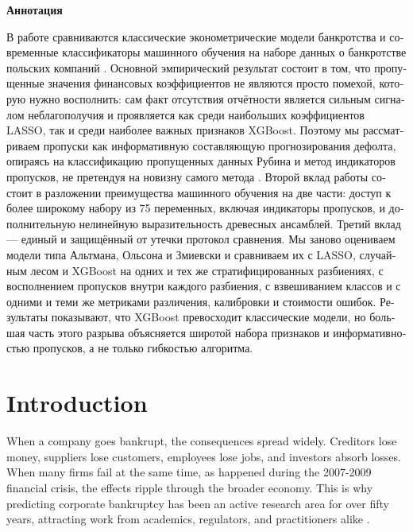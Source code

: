 \documentclass[12pt,a4paper]{article}
\begin{document}
\begin{otherlanguage}{russian}
\begin{center}
\textbf{Аннотация}
\end{center}
\noindent
В работе сравниваются классические эконометрические модели банкротства и
современные классификаторы машинного обучения на наборе данных о банкротстве
польских компаний \cite{zieba2016}. Основной эмпирический результат состоит в
том, что пропущенные значения финансовых коэффициентов не являются просто
помехой, которую нужно восполнить: сам факт отсутствия отчётности является
сильным сигналом неблагополучия и проявляется как среди наибольших
коэффициентов LASSO, так и среди наиболее важных признаков XGBoost. Поэтому мы
рассматриваем пропуски как информативную составляющую прогнозирования дефолта,
опираясь на классификацию пропущенных данных Рубина и метод индикаторов
пропусков, не претендуя на новизну самого метода \citep{rubin1976,jones1996}.
Второй вклад работы состоит в разложении преимущества машинного обучения на две
части: доступ к более широкому набору из 75 переменных, включая индикаторы
пропусков, и дополнительную нелинейную выразительность древесных ансамблей.
Третий вклад — единый и защищённый от утечки протокол сравнения. Мы заново
оцениваем модели типа Альтмана, Ольсона и Змиевски и сравниваем их с LASSO,
случайным лесом и XGBoost на одних и тех же стратифицированных разбиениях, с
восполнением пропусков внутри каждого разбиения, с взвешиванием классов и с
одними и теми же метриками различения, калибровки и стоимости ошибок.
Результаты показывают, что XGBoost превосходит классические модели, но большая
часть этого разрыва объясняется широтой набора признаков и информативностью
пропусков, а не только гибкостью алгоритма.
\end{otherlanguage}

\clearpage
\tableofcontents
\clearpage
\section{Introduction}

When a company goes bankrupt, the consequences spread widely. Creditors lose
money, suppliers lose customers, employees lose jobs, and investors absorb
losses. When many firms fail at the same time, as happened during the
2007-2009 financial crisis, the effects ripple through the broader economy.
This is why predicting corporate bankruptcy has been an active research area
for over fifty years, attracting work from academics, regulators, and
practitioners alike
\citep{altman1968, ohlson1980, zmijewski1984, shumway2001, campbell2008,
barboza2017, zieba2016, mai2019}.
\end{document}
